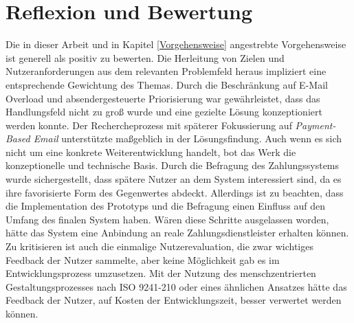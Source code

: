 \section{Reflexion und Bewertung}
\label{Reflektion_und_Bewertung}
Die in dieser Arbeit und in Kapitel \ref{Vorgehensweise} angestrebte Vorgehensweise ist generell als positiv zu bewerten. Die Herleitung von Zielen und Nutzeranforderungen aus dem relevanten Problemfeld heraus impliziert eine entsprechende Gewichtung des Themas. Durch die Beschränkung auf E-Mail Overload und absendergesteuerte Priorisierung war gewährleistet, dass das Handlungsfeld nicht zu groß wurde und eine gezielte Lösung konzeptioniert werden konnte. Der Rechercheprozess mit späterer Fokussierung auf \textit{Payment-Based Email} unterstützte maßgeblich in der Lösungsfindung. Auch wenn es sich nicht um eine konkrete Weiterentwicklung handelt, bot das Werk die konzeptionelle und technische Basis. Durch die Befragung des Zahlungssystems wurde sichergestellt, dass spätere Nutzer an dem System interessiert sind, da es ihre favorisierte Form des Gegenwertes abdeckt. Allerdings ist zu beachten, dass die Implementation des Prototyps und die Befragung einen Einfluss auf den Umfang des finalen System haben. Wären diese Schritte ausgelassen worden, hätte das System eine Anbindung an reale Zahlungsdienstleister erhalten können. Zu kritisieren ist auch die einmalige Nutzerevaluation, die zwar wichtiges Feedback der Nutzer sammelte, aber keine Möglichkeit gab es im Entwicklungsprozess umzusetzen. Mit der Nutzung des menschzentrierten Gestaltungsprozesses nach ISO 9241-210 oder eines ähnlichen Ansatzes hätte das Feedback der Nutzer, auf Kosten der Entwicklungszeit, besser verwertet werden können.

